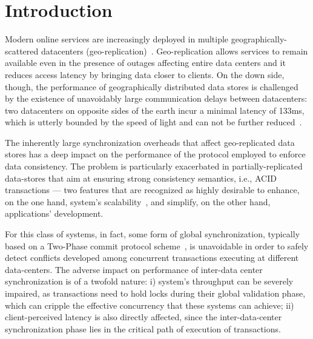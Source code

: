 \section{Introduction}
\label{sec:introduction}


Modern online services are increasingly deployed in multiple geographically-scattered datacenters (geo-replication)~\cite{spanner, kraska2013mdcc, li2012making}. Geo-replication allows services to remain available even in the presence of outages affecting entire data centers   and it reduces access latency by bringing data closer to clients. On the down side, though, the performance of geographically distributed data stores is challenged by the existence of unavoidably large communication delays between datacenters: two datacenters on opposite sides of the earth incur a minimal latency of 133ms, which is utterly bounded by the speed of light and can not be further reduced~\cite{bailis2013highly}. 

The inherently large synchronization overheads that affect geo-replicated data stores has a deep impact on the performance of the protocol employed to enforce data consistency. The problem is particularly exacerbated in partially-replicated data-stores that aim at ensuring strong consistency semantics, i.e., ACID transactions --- two features that are recognized as highly desirable to enhance, on the one hand, system's scalability~\cite{xxx}, and simplify, on the other hand, applications' development. 

For this class of systems, in fact, some form of global synchronization, typically based on a Two-Phase commit protocol scheme~\cite{xxx}, is unavoidable in order to safely detect conflicts developed among  concurrent transactions executing at different data-centers. The adverse impact on performance of inter-data center synchronization is of a twofold nature: i) system's throughput can be severely impaired, as  transactions need to hold locks during their global validation phase, which can cripple the effective concurrency that these systems can achieve; ii) client-perceived latency is also directly affected, since the inter-data-center  synchronization phase lies in the critical path of execution of transactions.



